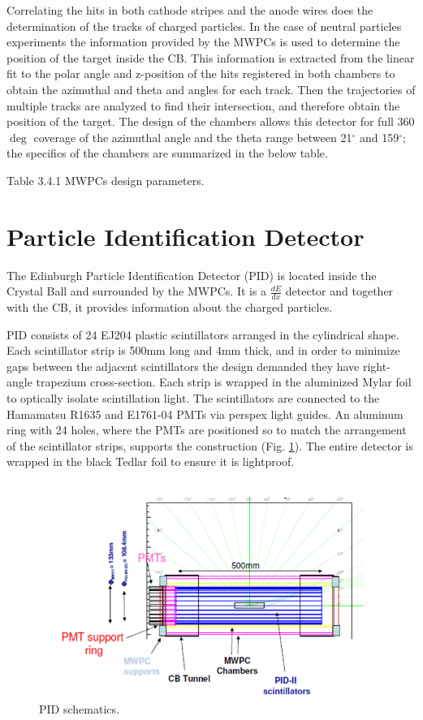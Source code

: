 \indent Correlating  the  hits  in  both  cathode  stripes  and  the  anode  wires  does  the determination of the tracks of charged particles. In the case of neutral particles experiments the information provided by the MWPCs is used to determine the position of the target inside the CB. This information is extracted from the linear fit to the polar angle and z-position of the hits registered in both chambers to obtain the azimuthal and theta and angles for each track. Then the trajectories of multiple tracks are analyzed to find their intersection, and therefore obtain the position of the target. The design of the chambers allows this detector for full 360$\deg$ coverage of the azimuthal angle and the theta range between 21$^{\circ}$ and 159$^{\circ}$; the specifics of the chambers are summarized in the below table.

Table 3.4.1 MWPCs design parameters.

\section{Particle Identification Detector}

\indent The Edinburgh Particle Identification Detector (PID) is located inside the Crystal Ball and surrounded by the MWPCs. It is a $\frac{dE}{dx}$ detector and together with the CB, it provides information about the charged particles.

\indent PID consists of 24 EJ204 plastic scintillators arranged in the cylindrical shape. Each scintillator strip is 500mm long and 4mm thick, and in order to minimize gaps between the adjacent scintillators the design demanded they have right-angle trapezium cross-section. Each strip is wrapped in the aluminized Mylar foil to  optically  isolate  scintillation  light.  The  scintillators  are  connected  to  the Hamamatsu R1635 and E1761-04 PMTs via perspex light guides. An aluminum ring with 24 holes, where the PMTs are positioned so to match the arrangement of  the  scintillator  strips,  supports  the  construction  (Fig. \ref{pid}).  The  entire detector is wrapped in the black Tedlar foil to ensure it is lightproof.

\begin{figure}[H]
\begin{center}
\includegraphics[scale=0.5]{pidschematics.png}
\caption{PID schematics.}
\label{pid}
\end{center}
\end{figure}

